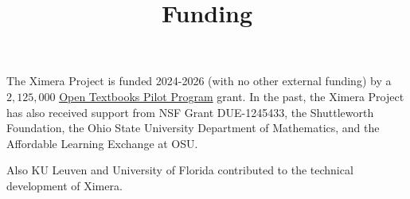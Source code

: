 \documentclass{ximera}
\title{Funding}
\begin{document}
\begin{abstract}
\end{abstract}
\maketitle

The Ximera Project is funded 2024-2026 (with no other external funding) by a $2,125,000$ 
\href{https://www.ed.gov/grants-and-programs/grants-higher-education/improvement-of-postsecondary-education/open-textbooks-pilot-program}{Open Textbooks Pilot Program} grant. 
In the past, the Ximera Project has also received support from NSF Grant DUE-1245433, the Shuttleworth Foundation, the Ohio State University Department of Mathematics, and the Affordable Learning Exchange at OSU.

Also KU Leuven and University of Florida contributed to the technical development of Ximera.
\end{document}
